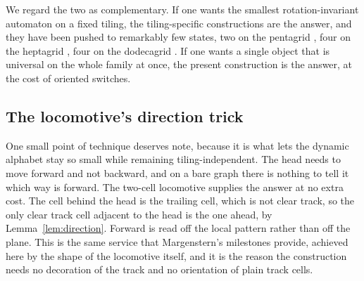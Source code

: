 We regard the two as complementary. If one wants the smallest rotation-invariant automaton on a fixed tiling,
the tiling-specific constructions are the answer, and they have been pushed to remarkably few states, two on
the pentagrid \cite{margenstern2015penta2}, four on the heptagrid \cite{margenstern2009hepta}, four on the
dodecagrid \cite{margenstern2021dodeca4}. If one wants a single object that is universal on the whole family at
once, the present construction is the answer, at the cost of oriented switches.

\subsection{The locomotive's direction trick}

One small point of technique deserves note, because it is what lets the dynamic alphabet stay so small while
remaining tiling-independent. The head needs to move forward and not backward, and on a bare graph there is
nothing to tell it which way is forward. The two-cell locomotive supplies the answer at no extra cost. The cell
behind the head is the trailing cell, which is not clear track, so the only clear track cell adjacent to the
head is the one ahead, by Lemma~\ref{lem:direction}. Forward is read off the local pattern rather than off the
plane. This is the same service that Margenstern's milestones provide, achieved here by the shape of the
locomotive itself, and it is the reason the construction needs no decoration of the track and no orientation of
plain track cells.
